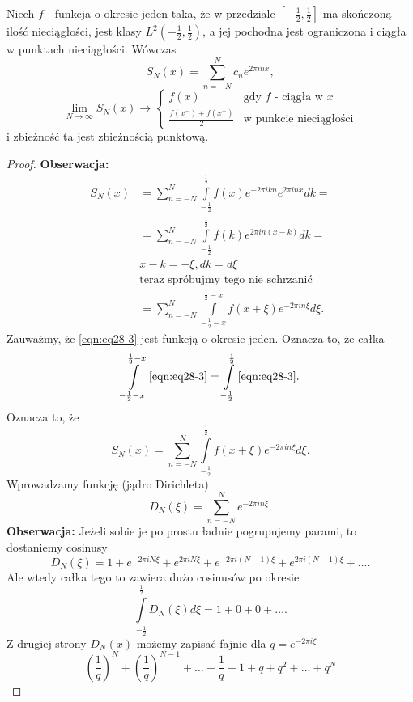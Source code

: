 \documentclass[../main.tex]{subfiles}
\begin{document}
\pagebreak
\begin{tw}
    Niech $f$ - funkcja o okresie jeden taka, że w przedziale $[-\frac{1}{2}, \frac{1}{2}]$ ma skończoną ilość nieciągłości, jest klasy $L^2(-\frac{1}{2}, \frac{1}{2})$, a jej pochodna jest ograniczona i ciągła w punktach nieciągłości. Wówczas
    \[
        S_N(x) = \sum_{n=-N}^{N} c_n e^{2\pi i n x}
    ,\]
\[
    \lim_{N \to \infty}S_N(x) \to \begin{cases}
        f(x) & \text{gdy $f$ - ciągła w $x$ }\\
        \frac{f(x^-) + f(x^+)}{2}& \text{w punkcie nieciągłości}
    \end{cases}
\]
i zbieżność ta jest zbieżnością punktową.
\end{tw}
\begin{proof}
    \textbf{Obserwacja: }
    \begin{align}
        S_N(x) &= \sum_{n=-N}^{N} \int\limits_{-\frac{1}{2}}^{\frac{1}{2}} f(x) e^{-2\pi i k n} e^{2\pi i n x} dk =\nonumber \\
        &= \sum_{n=-N}^{N} \int\limits_{-\frac{1}{2}}^{\frac{1}{2}} f(k) e^{2\pi i n(x-k)}dk =\nonumber \\
        &x - k = - \xi, dk = d\xi\nonumber\\
        &\text{teraz spróbujmy tego nie schrzanić}\nonumber\\
        \label{eqn:eq28-3}
        &= \sum_{n=-N}^{N} \int\limits_{-\frac{1}{2} - x}^{\frac{1}{2}-x}f(x+\xi)e^{-2\pi i n \xi}d\xi \tag{$\star\nabla\star$}
    .\end{align}
    Zauważmy, że \eqref{eqn:eq28-3} jest funkcją o okresie jeden. Oznacza to, że całka
    \[
        \int\limits_{-\frac{1}{2}-x}^{\frac{1}{2}-x} \eqref{eqn:eq28-3} = \int\limits_{-\frac{1}{2}}^{\frac{1}{2}} \eqref{eqn:eq28-3}
    .\]
Oznacza to, że
\[
    S_N(x) = \sum_{n=-N}^{N} \int\limits_{-\frac{1}{2}}^{\frac{1}{2}} f(x+\xi) e^{-2\pi i n \xi}d\xi
.\]
Wprowadzamy funkcję (jądro Dirichleta)
\[
    D_N(\xi) = \sum_{n=-N}^{N} e^{-2\pi i n \xi}
.\]
\textbf{Obserwacja: } Jeżeli sobie je po prostu ładnie pogrupujemy parami, to dostaniemy cosinusy
\[
    D_N(\xi) = 1 + e^{-2\pi i N \xi} + e^{2\pi i N \xi} + e^{-2\pi i (N-1)\xi} + e^{2\pi i (N-1)\xi} + \ldots
.\]
Ale wtedy całka tego to zawiera dużo cosinusów po okresie
\[
    \int\limits_{-\frac{1}{2}}^{\frac{1}{2}} D_N(\xi)d\xi = 1 + 0 + 0 + \ldots
.\]
Z drugiej strony $D_N(x)$ możemy zapisać fajnie dla $q = e^{-2\pi i \xi}$
\begin{equation}
    \label{eqn:eq28-4}
    \left( \frac{1}{q} \right) ^N + \left( \frac{1}{q} \right) ^{N-1} + \ldots + \frac{1}{q} + 1 + q + q^2 + \ldots + q^N \tag{$\nabla\star\nabla$}

\end{equation}
\end{proof}
\end{document}
